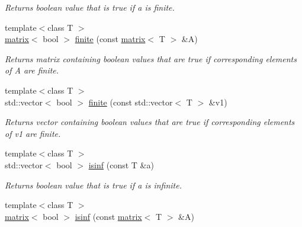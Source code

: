 \begin{DoxyCompactItemize}
\begin{DoxyCompactList}\small\item\em Returns boolean value that is true if a is finite. \end{DoxyCompactList}\item 
\hypertarget{namespacekeycpp_a8879482fc9af1a809453e1719948263b}{{\footnotesize template$<$class T $>$ }\\\hyperlink{classkeycpp_1_1matrix}{matrix}$<$ bool $>$ \hyperlink{namespacekeycpp_a8879482fc9af1a809453e1719948263b}{finite} (const \hyperlink{classkeycpp_1_1matrix}{matrix}$<$ T $>$ \&A)}\label{namespacekeycpp_a8879482fc9af1a809453e1719948263b}

\begin{DoxyCompactList}\small\item\em Returns matrix containing boolean values that are true if corresponding elements of A are finite. \end{DoxyCompactList}\item 
\hypertarget{namespacekeycpp_af4add0d0b269850e5f5fc1362d023666}{{\footnotesize template$<$class T $>$ }\\std\-::vector$<$ bool $>$ \hyperlink{namespacekeycpp_af4add0d0b269850e5f5fc1362d023666}{finite} (const std\-::vector$<$ T $>$ \&v1)}\label{namespacekeycpp_af4add0d0b269850e5f5fc1362d023666}

\begin{DoxyCompactList}\small\item\em Returns vector containing boolean values that are true if corresponding elements of v1 are finite. \end{DoxyCompactList}\item 
\hypertarget{namespacekeycpp_adca45e7f46618cf193b6b7bb59465a9d}{{\footnotesize template$<$class T $>$ }\\std\-::vector$<$ bool $>$ \hyperlink{namespacekeycpp_adca45e7f46618cf193b6b7bb59465a9d}{isinf} (const T \&a)}\label{namespacekeycpp_adca45e7f46618cf193b6b7bb59465a9d}

\begin{DoxyCompactList}\small\item\em Returns boolean value that is true if a is infinite. \end{DoxyCompactList}\item 
\hypertarget{namespacekeycpp_abf12e8a9c04720e074328bb1d34dce04}{{\footnotesize template$<$class T $>$ }\\\hyperlink{classkeycpp_1_1matrix}{matrix}$<$ bool $>$ \hyperlink{namespacekeycpp_abf12e8a9c04720e074328bb1d34dce04}{isinf} (const \hyperlink{classkeycpp_1_1matrix}{matrix}$<$ T $>$ \&A)}\label{namespacekeycpp_abf12e8a9c04720e074328bb1d34dce04}


\end{DoxyCompactItemize}
